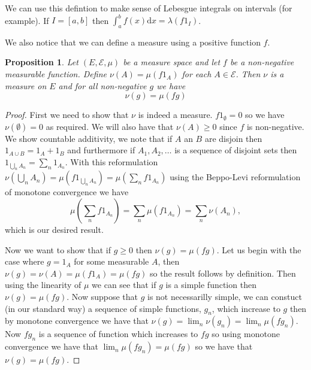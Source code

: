 \documentclass[11pt]{article}
\newtheorem{prp}[thm]{Proposition}
\theoremstyle{definition}
\theoremstyle{remark}
\begin{document}
We can use this defintion to make sense of Lebesgue integrals on intervals (for example). If $I= [a,b]$ then $\int_a^b f(x) \mathrm{d}x = \lambda(f1_I)$. 

We also notice that we can define a measure using a positive function $f$. 

\begin{prp}
Let $(E, \mathcal{E}, \mu)$ be a measure space and let $f$ be a non-negative measurable function. Define $\nu(A) = \mu(f1_A)$ for each $A \in \mathcal{E}$. Then $\nu$ is a measure on $E$ and for all non-negative $g$ we have
\[ \nu(g) = \mu(fg) \]
\end{prp}
\begin{proof}
First we need to show that $\nu$ is indeed a measure. $f1_\emptyset = 0$ so we have $\nu(\emptyset) = 0$ as required. We will also have that $\nu(A) \geq 0$ since $f$ is non-negative. We show countable additivity, we note that if $A$ an $B$ are disjoin then $1_{A \cup B} = 1_A + 1_B$ and furthermore if $A_1, A_2, \dots $ is a sequence of disjoint sets then $1_{\bigcup_n A_n} = \sum_n 1_{A_n}$. With this reformulation $\nu(\bigcup_n A_n) = \mu( f1_{\bigcup_n A_n}) = \mu ( \sum_n f1_{A_n})$ using the Beppo-Levi reformulation of monotone convergence we have
\[ \mu(\sum_n f1_{A_n} ) = \sum_n \mu(f1_{A_n}) = \sum_n \nu(A_n), \] which is our desired result. 

Now we want to show that if $g \geq 0$ then $\nu(g) = \mu(fg)$. Let us begin with the case where $g=1_A$ for some measurable $A$, then $\nu(g) = \nu(A) = \mu(f1_A) = \mu(fg)$ so the result follows by definition. Then using the linearity of $\mu$ we can see that if $g$ is a simple function then $\nu(g) = \mu(fg)$. Now suppose that $g$ is not necessarilly simple, we can constuct (in our standard way) a sequence of simple functions, $g_n$, which increase to $g$ then by monotone convergence we have that $\nu(g) = \lim_n \nu(g_n) = \lim_n \mu(f g_n)$. Now $fg_n$ is a sequence of function which increases to $fg$ so using monotone convergence we have that $\lim_n \mu(f g_n) = \mu(fg)$ so we have that $\nu(g) = \mu(fg)$.
\end{proof}
\end{document}
